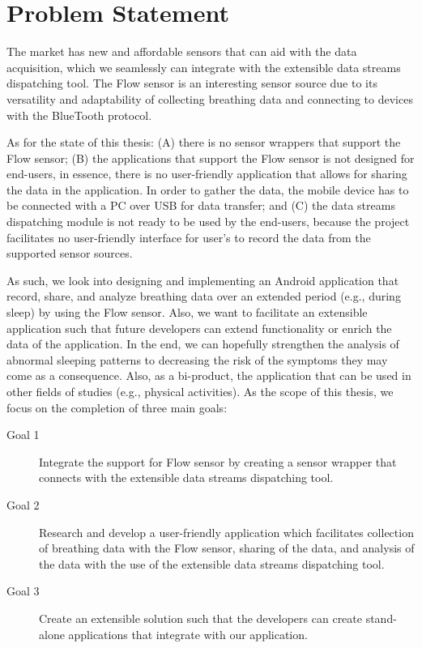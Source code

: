 \section{Problem Statement}

The market has new and affordable sensors that can aid with the data acquisition, which we seamlessly can integrate with the extensible data streams dispatching tool. The Flow sensor is an interesting sensor source due to its versatility and adaptability of collecting breathing data and connecting to devices with the BlueTooth protocol. 

As for the state of this thesis: (A) there is no sensor wrappers that support the Flow sensor; (B) the applications that support the Flow sensor is not designed for end-users, in essence, there is no user-friendly application that allows for sharing the data in the application. In order to gather the data, the mobile device has to be connected with a PC over USB for data transfer; and (C) the data streams dispatching module is not ready to be used by the end-users, because the project facilitates no user-friendly interface for user's to record the data from the supported sensor sources.

As such, we look into designing and implementing an Android application that record, share, and analyze breathing data over an extended period (e.g., during sleep) by using the Flow sensor. Also, we want to facilitate an extensible application such that future developers can extend functionality or enrich the data of the application. In the end, we can hopefully strengthen the analysis of abnormal sleeping patterns to decreasing the risk of the symptoms they may come as a consequence. Also, as a bi-product, the application that can be used in other fields of studies (e.g., physical activities). As the scope of this thesis, we focus on the completion of three main goals:

\begin{description}
    \item[Goal 1] Integrate the support for Flow sensor by creating a sensor wrapper that connects with the extensible data streams dispatching tool.
    \item[Goal 2] Research and develop a user-friendly application which facilitates collection of breathing data with the Flow sensor, sharing of the data, and analysis of the data with the use of the extensible data streams dispatching tool.
    \item[Goal 3] Create an extensible solution such that the developers can create stand-alone applications that integrate with our application. 
\end{description}

